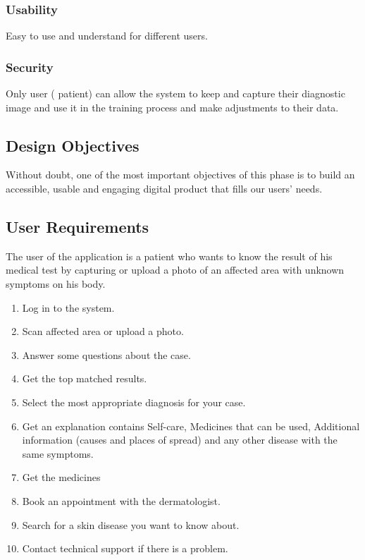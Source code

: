 \subsubsection{Usability}Easy to use and understand for different users.
\subsubsection{Security}Only user ( patient) can allow the system to keep and capture their diagnostic image and use it in the training process and make adjustments to their data.
\subsection{Design Objectives }
Without doubt, one of the most important objectives of this phase is to build an accessible, usable and engaging digital product that fills our users' needs.
\newpage
\subsection{User Requirements}
The user of the application is a patient who wants to know the result of his medical test by capturing or upload a photo of an affected area with unknown symptoms on his body.
\vspace{0.50cm}
\begin{enumerate}[label=\fbox{\arabic*}]
	\item Log in to the system.
	\item Scan affected area or upload a photo.
    \item Answer some questions about the case.
    \item Get the top matched results.
    \item Select the most appropriate diagnosis for your case.
    \item Get an explanation contains Self-care, Medicines that can be used, Additional information (causes and places of spread) and any other disease with the same symptoms.
    \item Get the medicines
    \item Book an appointment with the dermatologist.
    \item Search for a skin disease you want to know about.
    \item Contact technical support if there is a problem.
\end{enumerate}
\newpage
